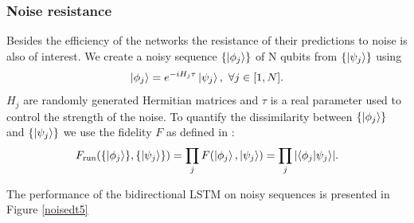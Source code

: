 \subsubsection{Noise resistance}
Besides the efficiency of the networks the resistance of their predictions to noise is also of interest.
We create a noisy sequence $\{\ket{\phi_j}\}$ of N qubits from $\{\ket{\psi_j}\}$ using
\begin{align*}
	\ket{\phi_j} = e^{-i H_j \tau} \ket{\psi_j}, \ \forall j \in [1, N].
\end{align*}
$H_j$ are randomly generated Hermitian matrices and $\tau$ is a real parameter used to control the strength of the noise.
To quantify the dissimilarity between $\{\ket{\phi_j}\}$ and $\{\ket{\psi_j}\}$ we use the fidelity $F$ as defined in \cite{10.5555/1972505}:
\begin{align*}
	F_{\text{run}}(\{\ket{\phi_j}\}, \{\ket{\psi_j}\}) = \prod_j F(\ket{\phi_j}, \ket{\psi_j}) = \prod_j \abs{\bra{\phi_j}\ket{\psi_j}}.
\end{align*}

The performance of the bidirectional LSTM on noisy sequences is presented in Figure \ref{noisedt5} 

